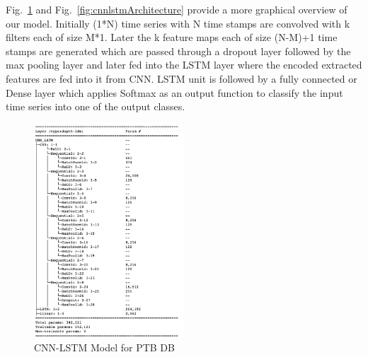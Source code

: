 \documentclass{ieeeaccess}
\begin{document}
Fig.~\ref{fig:CNN-LSTM} and Fig.~\ref{fig:cnnlstmArchitecture} provide a more graphical overview of our model. Initially (1*N) time series with N time stamps are convolved with k filters each of size M*1. Later the k feature maps each of size (N-M)+1 time stamps are generated which are passed through a dropout layer followed by the max pooling layer and later fed into the LSTM layer where the encoded extracted features are fed into it from CNN. LSTM unit is followed by a fully connected or Dense layer which applies Softmax as an output function to classify the input time series into one of the output classes.
\begin{figure}[!ht]
\includegraphics[width=0.5\textwidth]{Images/cnn-lstm.png}
\caption{CNN-LSTM Model for PTB DB}
\label{fig:CNN-LSTM}
\end{figure} 

\end{document}
